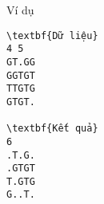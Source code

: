 Ví dụ
\begin{verbatim}
\textbf{Dữ liệu}
4 5
GT.GG
GGTGT
TTGTG
GTGT.	

\textbf{Kết quả}
6
.T.G.
.GTGT
T.GTG
G..T.
\end{verbatim}